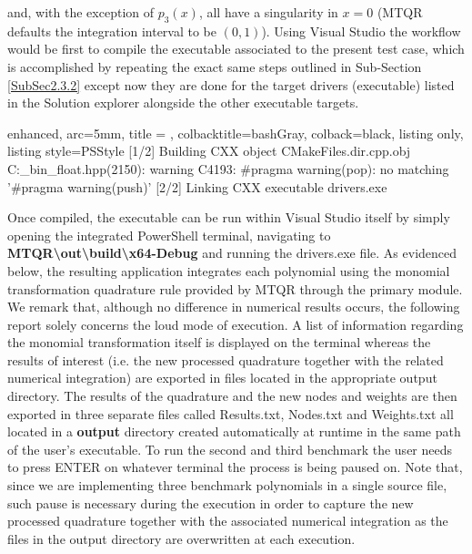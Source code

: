 \documentclass[a4paper, twosided]{book}
\begin{document}
\noindent
and, with the exception of $p_3(x)$, all have a singularity in $x=0$ (MTQR defaults the integration interval to be $(0,1)$). Using Visual Studio the workflow would be first to compile the executable associated to the present test case, which is accomplished by repeating the exact same steps outlined in Sub-Section \ref{SubSec2.3.2} except now they are done for the target \colorbox{poliGrayBlue}{drivers (executable)} listed in the \colorbox{poliGrayBlue}{Solution explorer} alongside the other executable targets.

\vspace{0.2cm}
\begin{tcblisting}{enhanced,
                   arc=5mm,
                   title = \color{black}{\large \ttfamily Compiling the drivers test case},
                   colbacktitle=bashGray,
                   colback=black,
                   listing only,
                   listing style=PSStyle}
[1/2] Building CXX object CMakeFiles\drivers.dir\tests\drivers\main.cpp.obj
C:\boost\boost\multiprecision\cpp_bin_float.hpp(2150): warning C4193: #pragma warning(pop): no matching '#pragma warning(push)'
[2/2] Linking CXX executable drivers.exe
\end{tcblisting}
\vspace{0.3cm}

\noindent
Once compiled, the executable can be run within Visual Studio itself by simply opening the integrated PowerShell terminal, navigating to \colorbox{poliGrayBlue}{\textbf{MTQR\textbackslash out\textbackslash build\textbackslash x64-Debug}} and running the \colorbox{poliGrayBlue}{drivers.exe} file. As evidenced below, the resulting application integrates each polynomial using the monomial transformation quadrature rule provided by MTQR through the primary module. We remark that, although no difference in numerical results occurs, the following report solely concerns the loud mode of execution. A list of information regarding the monomial transformation itself is displayed on the terminal whereas the results of interest (i.e. the new processed quadrature together with the related numerical integration) \color{black} are exported in files located in the appropriate output directory. 
\newline
The results of the quadrature and the new nodes and weights are then exported in three separate files called \colorbox{poliGrayBlue}{Results.txt}, \colorbox{poliGrayBlue}{Nodes.txt} and \colorbox{poliGrayBlue}{Weights.txt} all located in a \colorbox{poliGrayBlue}{\textbf{output}} directory created automatically at runtime in the same path of the user’s executable. To run the second and third benchmark the user needs to press \colorbox{poliGrayBlue}{ENTER} on whatever terminal the process is being paused on. Note that, since we are implementing three benchmark polynomials in a single source file, such pause is necessary during the execution in order to capture the new processed quadrature together with the associated numerical integration as the files in the output directory are overwritten at each execution.
\end{document}
